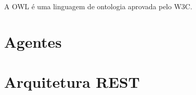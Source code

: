 A OWL é uma linguagem de ontologia aprovada pelo W3C.




\section{Agentes} %
\label{sec:agentes}






\section{Arquitetura REST} %
\label{sec:arquitetura_rest}





